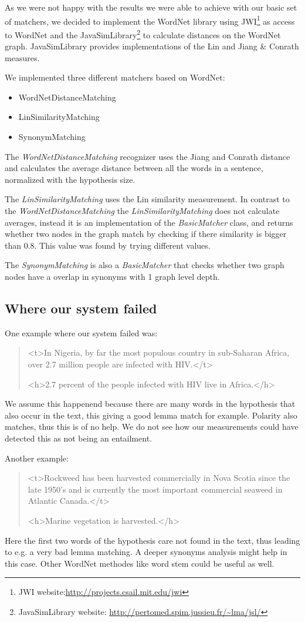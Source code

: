 As we were not happy with the results we were able to achieve with our basic set of matchers, we decided to implement
the WordNet library using JWI\footnote{JWI website:\url{http://projects.csail.mit.edu/jwi}} as access to WordNet and the
JavaSimLibrary\footnote{JavaSimLibrary website: \url{http://pertomed.spim.jussieu.fr/~lma/jsl/}} to calculate distances
on the WordNet graph. JavaSimLibrary provides implementations of the Lin and Jiang \& Conrath measures.

We implemented three different matchers based on WordNet:
\begin{itemize}
    \item WordNetDistanceMatching
    \item LinSimilarityMatching
    \item SynonymMatching
\end{itemize} 

The \textit{WordNetDistanceMatching} recognizer uses the Jiang and Conrath distance and calculates the average distance
between all the words in a sentence, normalized with the hypothesis size.

The \textit{LinSimilarityMatching} uses the Lin similarity measurement. In contrast to the
\textit{WordNetDistanceMatching} the \textit{LinSimilarityMatching} does not calculate averages, instead it is an
implementation of the \textit{BasicMatcher} class, and returns whether two nodes in the graph match by checking if there
similarity is bigger than 0.8. This value was found by trying different values.

The \textit{SynonymMatching} is also a \textit{BasicMatcher} that checks whether two graph nodes have a overlap in synonyms
with 1 graph level depth.

\subsection{Where our system failed}
One example where our system failed was:
\begin{quote}
<t>In Nigeria, by far the most populous country in sub-Saharan Africa, over 2.7 million people are infected with HIV.</t>

<h>2.7 percent of the people infected with HIV live in Africa.</h>
\end{quote}
We assume this happenend because there are many words in the hypothesis that also occur in the text, this giving a good
lemma match for example. Polarity also matches, thus this is of no help. We do not see how our measurements could have
detected this as not being an entailment.


Another example:
\begin{quote}
<t>Rockweed has been harvested commercially in Nova Scotia since the late 1950's and is currently the most important commercial seaweed in Atlantic Canada.</t>

<h>Marine vegetation is  harvested.</h>
\end{quote}
Here the first two words of the hypothesis care not found in the text, thus leading to e.g. a very bad lemma matching. A
deeper synonyms analysis might help in this case. Other WordNet methodes like word stem could be useful as well.



